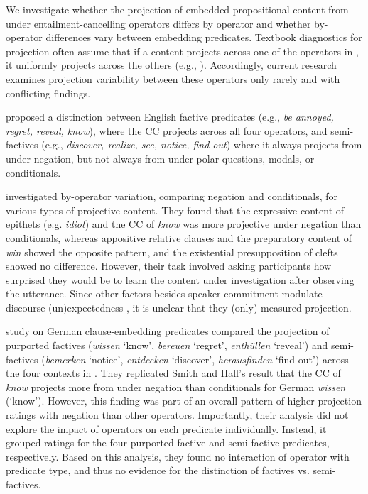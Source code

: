 \documentclass[a4paper,12pt,twoside]{article}
\begin{document}
	We investigate whether the projection of embedded propositional content from under entailment-cancelling operators differs by operator and whether by-operator differences vary between embedding predicates.
	Textbook diagnostics for projection often assume that if a content projects across one of the operators in \Last, it uniformly projects across the others (e.g., \citealt{chierchia_meaning_1990}). Accordingly, current research examines projection variability between these operators only rarely and with conflicting findings.
	
	\citet{karttunen_observations_1971} proposed a distinction between English factive predicates (e.g., \textit{be annoyed, regret, reveal, know}), where the CC projects across all four operators, and semi-factives (e.g., \textit{discover, realize, see, notice, find out}) where it always projects from under negation, but not always from under polar questions, modals, or conditionals. 

	\citet{smith_relationship_2014} investigated by-operator variation, comparing negation and conditionals, for various types of projective content. They found that the expressive content of epithets (e.g. \textit{idiot}) and the CC of \textit{know} was more projective under negation than conditionals, whereas appositive relative clauses and the preparatory content of \textit{win} showed the opposite pattern, and the existential presupposition of clefts showed no difference. However, their task involved asking participants how surprised they would be to learn the content under investigation after observing the utterance. Since other factors besides speaker commitment modulate discourse (un)expectedness \citep[see e.g.][]{zimmermann_grammatical_2011,tonnis_german_2021}, it is unclear that they (only) measured projection. 

	 study on German clause-embedding predicates compared the projection of purported factives (\textit{wissen} `know', \textit{bereuen} `regret', \textit{enthüllen} `reveal') and semi-factives (\textit{bemerken} `notice', \textit{entdecken} `discover', \textit{herausfinden} `find out') across the four contexts in \Last. They replicated Smith and Hall's result that the CC of \textit{know} projects more from under negation than conditionals for German \textit{wissen} (`know'). However, this finding was part of an overall pattern of higher projection ratings with negation than other operators.
	Importantly, their analysis did not explore the impact of operators on each predicate individually. Instead, it grouped ratings for the four purported factive and semi-factive predicates, respectively. Based on this analysis, they found no interaction of operator with predicate type, and thus no evidence for the distinction of factives vs. semi-factives.
\end{document}
